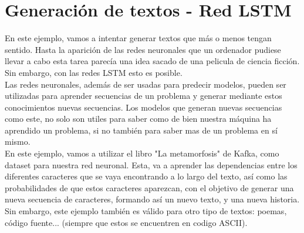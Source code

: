 \section{Generación de textos - Red LSTM}
En este ejemplo, vamos a intentar generar textos que más o menos tengan sentido. Hasta la aparición de las redes neuronales que un ordenador pudiese llevar a cabo esta tarea parecía una idea sacado de una pelicula de ciencia ficción. Sin embargo, con las redes LSTM esto es posible.\\
Las redes neuronales, además de ser usadas para predecir modelos, pueden ser utilizadas para aprender secuencias de un problema y generar mediante estos conocimientos nuevas secuencias. Los modelos que generan nuevas secuencias como este, no solo son utiles para saber como de bien nuestra máquina ha aprendido un problema, si no también para saber mas de un problema en sí mismo.\\
En este ejemplo, vamos a utilizar el libro "La metamorfosis" de Kafka, como dataset para nuestra red neuronal. Esta, va a aprender  las dependencias entre los diferentes caracteres que se vaya encontrando a lo largo del texto, así como las probabilidades de que estos caracteres aparezcan, con el objetivo de generar una nueva secuencia de caracteres, formando así un nuevo texto, y una nueva historia. Sin embargo, este ejemplo también es válido para otro tipo de textos: poemas, código fuente... (siempre que estos se encuentren en codigo ASCII).
